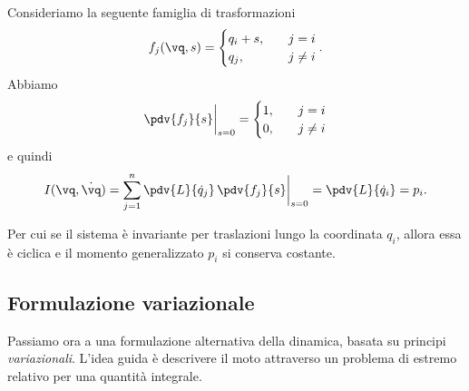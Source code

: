 \begin{example}
    Consideriamo la seguente famiglia di trasformazioni
    \begin{equation*}
        f_j(\vq,s) = \begin{cases}
        q_i + s,\quad &j=i\\
        q_j, \quad &j\neq i
        \end{cases}.
    \end{equation*}
    Abbiamo
    \begin{equation*}
        \pdv{f_j}{s}\bigg|_{s=0} = \begin{cases}
        1, \quad &j=i\\
        0, \quad &j\neq i
        \end{cases}
    \end{equation*}
    e quindi
    \begin{equation*}
        I(\vq, \dot{\vq}) = \sum_{j=1}^n \pdv{L}{\dot{q}_j}\,\pdv{f_j}{s}\bigg|_{s=0} = \pdv{L}{\dot{q}_i} = p_i.
    \end{equation*}

    Per cui se il sistema è invariante per traslazioni lungo la coordinata $q_i$, allora essa è ciclica e il momento generalizzato $p_i$ si conserva costante.
\end{example}

\subsection{Formulazione variazionale}
Passiamo ora a una formulazione alternativa della dinamica, basata su principi \emph{variazionali}. L'idea guida è descrivere il moto attraverso un problema di estremo relativo per una quantità integrale.

